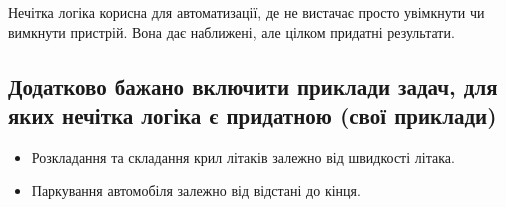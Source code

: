 \documentclass{article}
\begin{document}
        Нечітка логіка корисна для автоматизації, де не вистачає просто увімкнути чи вимкнути пристрій. Вона дає наближені, але цілком придатні результати.
    
        \subsection{Додатково бажано включити приклади задач, для яких нечітка логіка є придатною (свої приклади)}
            \begin{itemize}
                \item Розкладання та складання крил літаків залежно від швидкості літака.
                \item Паркування автомобіля залежно від відстані до кінця.
            \end{itemize}
        
\end{document}
